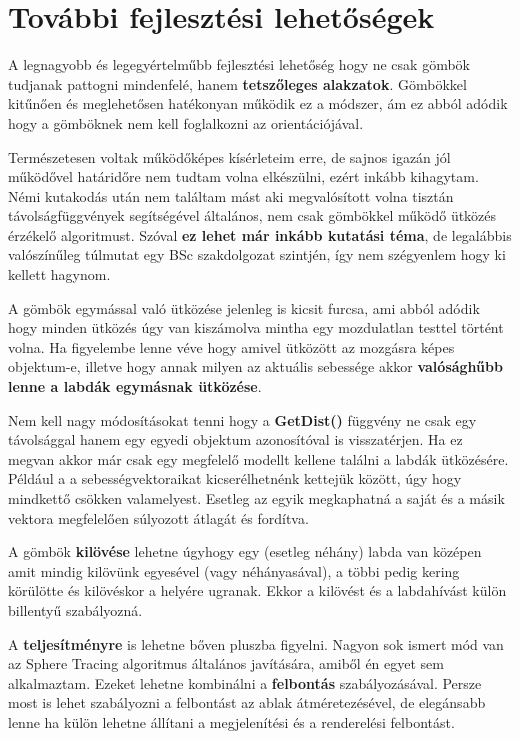 \chapter{További fejlesztési lehetőségek}
\label{ch:more}

A legnagyobb és legegyértelműbb fejlesztési lehetőség hogy ne csak gömbök tudjanak pattogni mindenfelé, hanem \textbf{tetszőleges alakzatok}. Gömbökkel kitűnően és meglehetősen hatékonyan működik ez a módszer, ám ez abból adódik hogy a gömböknek nem kell foglalkozni az orientációjával.

Természetesen voltak működőképes kísérleteim erre, de sajnos igazán jól működővel határidőre nem tudtam volna elkészülni, ezért inkább kihagytam. Némi kutakodás után nem találtam mást aki megvalósított volna tisztán távolságfüggvények segítségével általános, nem csak gömbökkel működő ütközés érzékelő algoritmust. Szóval \textbf{ez lehet már inkább kutatási téma}, de legalábbis valószínűleg túlmutat egy BSc szakdolgozat szintjén, így nem szégyenlem hogy ki kellett hagynom.

A gömbök egymással való ütközése jelenleg is kicsit furcsa, ami abból adódik hogy minden ütközés úgy van kiszámolva mintha egy mozdulatlan testtel történt volna. Ha figyelembe lenne véve hogy amivel ütközött az mozgásra képes objektum-e, illetve hogy annak milyen az aktuális sebessége akkor \textbf{valósághűbb lenne a labdák egymásnak ütközése}.

Nem kell nagy módosításokat tenni hogy a \textbf{GetDist()} függvény ne csak egy távolsággal hanem egy egyedi objektum azonosítóval is visszatérjen. Ha ez megvan akkor már csak egy megfelelő modellt kellene találni a labdák ütközésére. Például a a sebességvektoraikat kicserélhetnénk kettejük között, úgy hogy mindkettő csökken valamelyest. Esetleg az egyik megkaphatná a saját és a másik vektora megfelelően súlyozott átlagát és fordítva.

A gömbök \textbf{kilövése} lehetne úgyhogy egy (esetleg néhány) labda van középen amit mindig kilövünk egyesével (vagy néhányasával), a többi pedig kering körülötte és kilövéskor a helyére ugranak. Ekkor a kilövést és a labdahívást külön billentyű szabályozná. 

A \textbf{teljesítményre} is lehetne bőven pluszba figyelni. Nagyon sok ismert mód van az Sphere Tracing algoritmus általános javítására, amiből én egyet sem alkalmaztam. Ezeket lehetne kombinálni a \textbf{felbontás} szabályozásával. Persze most is lehet szabályozni a felbontást az ablak átméretezésével, de elegánsabb lenne ha külön lehetne állítani a megjelenítési és a renderelési felbontást.

